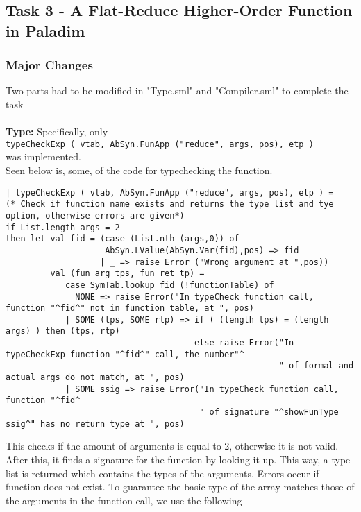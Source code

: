 \documentclass[12pt]{article}
\begin{document}
\newpage
\subsection{Task 3 - A Flat-Reduce Higher-Order Function in Paladim}
\subsubsection{Major Changes}
Two parts had to be modified in "Type.sml" and "Compiler.sml" to complete the task\\
\\
\textbf{Type:} Specifically, only\\ 
\texttt{typeCheckExp ( vtab, AbSyn.FunApp ("reduce", args, pos), etp )} \\
was implemented.\\
Seen below is, some, of the code for typechecking the function.
\begingroup
    \fontsize{7pt}{12pt}\selectfont
    \begin{verbatim}
| typeCheckExp ( vtab, AbSyn.FunApp ("reduce", args, pos), etp ) =
(* Check if function name exists and returns the type list and tye option, otherwise errors are given*)
if List.length args = 2
then let val fid = (case (List.nth (args,0)) of
                    AbSyn.LValue(AbSyn.Var(fid),pos) => fid
                   | _ => raise Error ("Wrong argument at ",pos))
         val (fun_arg_tps, fun_ret_tp) =
            case SymTab.lookup fid (!functionTable) of
              NONE => raise Error("In typeCheck function call, function "^fid^" not in function table, at ", pos)
            | SOME (tps, SOME rtp) => if ( (length tps) = (length args) ) then (tps, rtp)
                                      else raise Error("In typeCheckExp function "^fid^" call, the number"^
                                                       " of formal and actual args do not match, at ", pos)
            | SOME ssig => raise Error("In typeCheck function call, function "^fid^
                                       " of signature "^showFunType ssig^" has no return type at ", pos)

    \end{verbatim}
\endgroup
This checks if the amount of arguments is equal to 2, otherwise it is not valid. After this, it finds a signature for the function by looking it up. This way, a type list is returned which contains the types of the arguments. Errors occur if function does not exist. To guarantee the basic type of the array matches those of the arguments in the function call, we use the following
\begingroup
    \fontsize{7pt}{12pt}\selectfont
\end{document}

